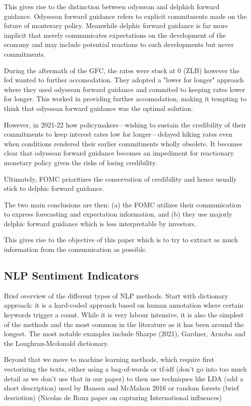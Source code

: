 \documentclass[11pt]{article}
\begin{document}
This gives rise to the distinction between odyssean and delphich forward guidance. Odyssean forward guidance refers to explicit commitments made on the future of monterary policy. Meanwhile delphic forward guidance is far more implicit that merely communicates expectations on the development of the economy and may include potential reactions to such developments but never commitments.

During the aftermath of the GFC, the rates were stuck at 0 (ZLB) however the fed wanted to further accomodation. They adopted a "lower for longer" approach where they used odyssean forward guidance and commited to keeping rates lower for longer. This worked in providing further accomodation, making it tempting to think that odyssean forward guidance was the optimal solution.

However, in 2021-22 how policymakers—wishing to sustain the credibility of their commitments to keep interest rates low for longer—delayed hiking rates even when conditions rendered their earlier commitments wholly obsolete. It becomes clear that odyssean forward guidance becomes an impediment for reactionary monetary policy given the risks of losing credibility.

Ultimately, FOMC prioritizes the conservation of credibility and hence usually stick to delphic forward guidance.

The two main conclusions are then: (a) the FOMC utilizes their communication to express forecasting and expectation information, and (b) they use majorly delphic forward guidance which is less interpretable by investors.

This gives rise to the objective of this paper which is to try to extract as much information from the comunnication as possible.

\subsection{NLP Sentiment Indicators}
Brief overview of the different types of NLP methods.
Start with dictionary approach: it is a hard-coded approach based on human annotation where certain keywords trigger a count. While it is very labour intensive, it is also the simplest of the methods and the most common in the literature as it has been around the longest. The most notable examples include Sharpe (2021), Gardner, Aruoba and the Loughran-Mcdonald dictionary.

Beyond that we move to machine learning methods, which require first vectorizing the texts, either using a bag-of-words or tf-idf (don't go into too much detail as we don't use that in our paper) to then use techniques like LDA (add a short description) used by Hansen and McMahon 2016 or random forests (brief desriotion) (Nicolas de Roux paper on capturing International influences)
\end{document}
